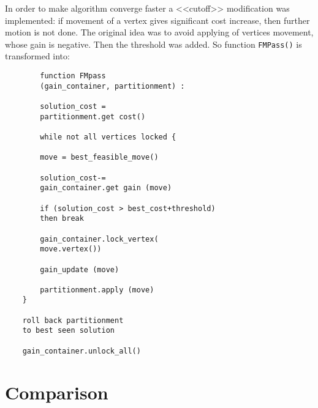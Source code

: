 \documentclass[12pt,a4paper,twocolumn]{article}
\begin{document}
	In order to make algorithm converge faster a <<cutoff>> modification was implemented: if movement of a vertex gives significant cost increase, then further motion is not done. The original idea was to avoid applying of vertices movement, whose gain is negative. Then the threshold was added. So function \texttt{FMPass()} is transformed into:
	\begin{verbatim}
		function FMpass
		(gain_container, partitionment) :
		
		solution_cost = 
		partitionment.get cost()
		
		while not all vertices locked {
		
		move = best_feasible_move()
		
		solution_cost-= 
		gain_container.get gain (move)
		
		if (solution_cost > best_cost+threshold)
		then break
		
		gain_container.lock_vertex(
		move.vertex())
		
		gain_update (move)
		
		partitionment.apply (move)
	}
	
	roll back partitionment 
	to best seen solution
	
	gain_container.unlock_all()

	\end{verbatim}
	
	\section{Comparison}
	
\end{document}
